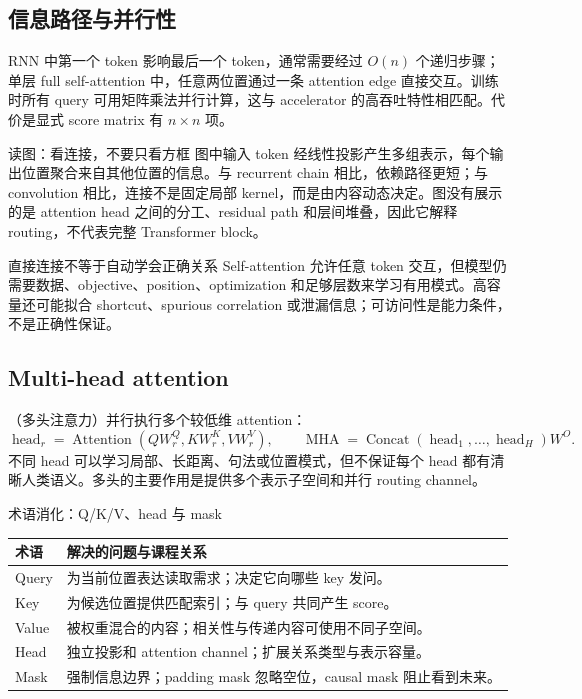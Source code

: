 \subsection{信息路径与并行性}

RNN 中第一个 token 影响最后一个 token，通常需要经过 $O(n)$ 个递归步骤；单层 full self-attention 中，任意两位置通过一条 attention edge 直接交互。训练时所有 query 可用矩阵乘法并行计算，这与 accelerator 的高吞吐特性相匹配。代价是显式 score matrix 有 $n\times n$ 项。


\begin{knowledgebox}{读图：看连接，不要只看方框}
图中输入 token 经线性投影产生多组表示，每个输出位置聚合来自其他位置的信息。与 recurrent chain 相比，依赖路径更短；与 convolution 相比，连接不是固定局部 kernel，而是由内容动态决定。图没有展示的是 attention head 之间的分工、residual path 和层间堆叠，因此它解释 routing，不代表完整 Transformer block。
\end{knowledgebox}

\begin{warningbox}{直接连接不等于自动学会正确关系}
Self-attention 允许任意 token 交互，但模型仍需要数据、objective、position、optimization 和足够层数来学习有用模式。高容量还可能拟合 shortcut、spurious correlation 或泄漏信息；可访问性是能力条件，不是正确性保证。
\end{warningbox}

\subsection{Multi-head attention}

（多头注意力）并行执行多个较低维 attention：
\[
\operatorname{head}_r=\operatorname{Attention}(QW_r^Q,KW_r^K,VW_r^V),
\qquad
\operatorname{MHA}=\operatorname{Concat}(\operatorname{head}_1,\ldots,\operatorname{head}_H)W^O.
\]
不同 head 可以学习局部、长距离、句法或位置模式，但不保证每个 head 都有清晰人类语义。多头的主要作用是提供多个表示子空间和并行 routing channel。

\begin{knowledgebox}{术语消化：Q/K/V、head 与 mask}
\begin{tabularx}{\textwidth}{L{0.18\textwidth} X}
\toprule
术语 & 解决的问题与课程关系 \\
\midrule
Query & 为当前位置表达读取需求；决定它向哪些 key 发问。 \\
Key & 为候选位置提供匹配索引；与 query 共同产生 score。 \\
Value & 被权重混合的内容；相关性与传递内容可使用不同子空间。 \\
Head & 独立投影和 attention channel；扩展关系类型与表示容量。 \\
Mask & 强制信息边界；padding mask 忽略空位，causal mask 阻止看到未来。 \\
\bottomrule
\end{tabularx}
\end{knowledgebox}

